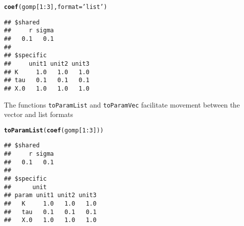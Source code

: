 \documentclass[12pt]{article}\usepackage[]{graphicx}\usepackage[table]{xcolor}
\makeatletter
\newcommand{\hlnum}[1]{\textcolor[rgb]{0.686,0.059,0.569}{#1}}%
\newcommand{\hlsng}[1]{\textcolor[rgb]{0.192,0.494,0.8}{#1}}%
\newcommand{\hlopt}[1]{\textcolor[rgb]{0,0,0}{#1}}%
\newcommand{\hldef}[1]{\textcolor[rgb]{0.345,0.345,0.345}{#1}}%
\newcommand{\hlkwc}[1]{\textcolor[rgb]{0.333,0.667,0.333}{#1}}%
\newcommand{\hlkwd}[1]{\textcolor[rgb]{0.737,0.353,0.396}{\textbf{#1}}}%
\newenvironment{kframe}{%
 \def\at@end@of@kframe{}%
 \ifinner\ifhmode%
  \def\at@end@of@kframe{\end{minipage}}%
  \begin{minipage}{\columnwidth}%
 \fi\fi%
 \def\FrameCommand##1{\hskip\@totalleftmargin \hskip-\fboxsep
 \colorbox{shadecolor}{##1}\hskip-\fboxsep
     \hskip-\linewidth \hskip-\@totalleftmargin \hskip\columnwidth}%
 \MakeFramed {\advance\hsize-\width
   \@totalleftmargin\z@ \linewidth\hsize
   \@setminipage}}%
 {\par\unskip\endMakeFramed%
 \at@end@of@kframe}
\newenvironment{knitrout}{}{} %
\newcommand\code{\texttt}
\makeatother
\begin{document}
\begin{knitrout}
\color{fgcolor}\begin{kframe}
\begin{alltt}
\hlkwd{coef}\hldef{(gomp[}\hlnum{1}\hlopt{:}\hlnum{3}\hldef{],} \hlkwc{format} \hldef{=} \hlsng{'list'}\hldef{)}
\end{alltt}
\begin{verbatim}
## $shared
##     r sigma 
##   0.1   0.1 
## 
## $specific
##     unit1 unit2 unit3
## K     1.0   1.0   1.0
## tau   0.1   0.1   0.1
## X.0   1.0   1.0   1.0
\end{verbatim}
\end{kframe}
\end{knitrout}
\noindent The functions \code{toParamList} and \code{toParamVec} facilitate movement between the vector and list formats
\begin{knitrout}
\color{fgcolor}\begin{kframe}
\begin{alltt}
\hlkwd{toParamList}\hldef{(}\hlkwd{coef}\hldef{(gomp[}\hlnum{1}\hlopt{:}\hlnum{3}\hldef{]))}
\end{alltt}
\begin{verbatim}
## $shared
##     r sigma 
##   0.1   0.1 
## 
## $specific
##      unit
## param unit1 unit2 unit3
##   K     1.0   1.0   1.0
##   tau   0.1   0.1   0.1
##   X.0   1.0   1.0   1.0
\end{verbatim}
\end{kframe}
\end{knitrout}
\end{document}

